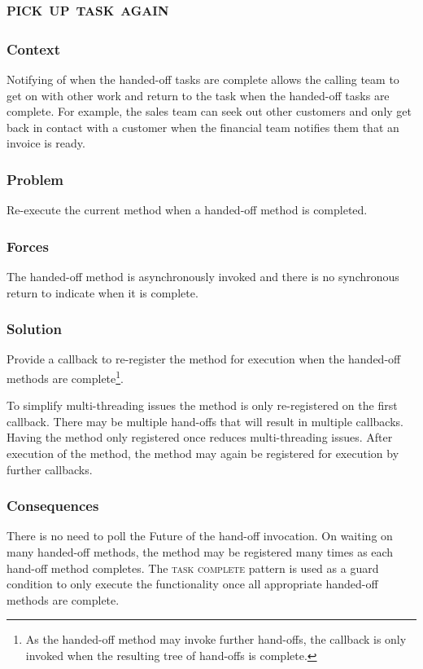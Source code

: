 \documentclass[prodmode]{style/acmlarge}
\begin{document}
\subsection{\textsc{\textbf{pick up task again}}}

\subsubsection*{Context} Notifying of when the handed-off tasks are complete allows
the calling team to get on with other work and return to the task when the
handed-off tasks are complete.  For example, the sales team can seek out other
customers and only get back in contact with a customer when the financial team
notifies them that an invoice is ready.

\subsubsection*{Problem} Re-execute the current method when a handed-off method
is completed.

\subsubsection*{Forces} The handed-off method is asynchronously invoked and there is
no synchronous return to indicate when it is complete.

\subsubsection*{Solution} Provide a callback to re-register the method for
execution when the handed-off methods are complete\footnote{As the handed-off
method may invoke further hand-offs, the callback is only invoked when the
resulting tree of hand-offs is complete.}.

To simplify multi-threading issues the method is only re-registered on the first
callback.  There may be multiple hand-offs that will result in multiple
callbacks.  Having the method only registered once reduces multi-threading
issues.  After execution of the method, the method may again be registered for
execution by further callbacks.

\subsubsection*{Consequences} There is no need to poll the Future of the
hand-off invocation.  On waiting on many handed-off methods, the method may be
registered many times as each hand-off method completes.  The \textsc{task
complete} pattern is used as a guard condition to only execute the functionality
once all appropriate handed-off methods are complete.
\end{document}
